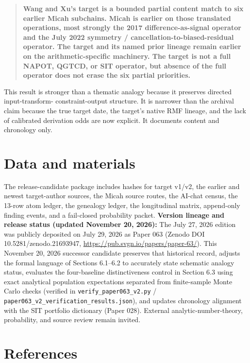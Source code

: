 \documentclass[
  american,
  11pt,
  letterpaper,
]{article}
\begin{document}
\begin{quote}
\textbf{Wang and Xu's target is a bounded partial content match to six earlier Micah subchains. Micah is earlier on those translated operations, most strongly the 2017 difference-as-signal operator and the July 2022 symmetry / cancellation-to-biased-residual operator. The target and its named prior lineage remain earlier on the arithmetic-specific machinery. The target is not a full NAPOT, QGTCD, or SIT operator, but absence of the full operator does not erase the six partial priorities.}
\end{quote}

This result is stronger than a thematic analogy because it preserves directed input-transform- constraint-output structure. It is narrower than the archival claim because the true target date, the target's native RMF lineage, and the lack of calibrated derivation odds are now explicit. It documents content and chronology only.

\section{Data and materials}\label{data-and-materials}

The release-candidate package includes hashes for target v1/v2, the earlier and newest target-author sources, the Micah source routes, the AI-chat census, the 13-row atom ledger, the genealogy ledger, the longitudinal matrix, append-only finding events, and a fail-closed probability packet. \textbf{Version lineage and release status (updated November 20, 2026):} The July 27, 2026 edition was publicly deposited on July 29, 2026 as Paper 063 (Zenodo DOI 10.5281/zenodo.21693947, \url{https://pub.svgn.io/papers/paper-63/}). This November 20, 2026 successor candidate preserves that historical record, adjusts the formal language of Sections 6.1--6.2 to accurately state schematic analogy status, evaluates the four-baseline distinctiveness control in Section 6.3 using exact analytical population expectations separated from finite-sample Monte Carlo checks (verified in \nolinkurl{verify_paper063_v2.py} / \nolinkurl{paper063_v2_verification_results.json}), and updates chronology alignment with the SIT portfolio dictionary (Paper 028). External analytic-number-theory, probability, and source review remain invited.

\section{References}\label{references}
\end{document}
